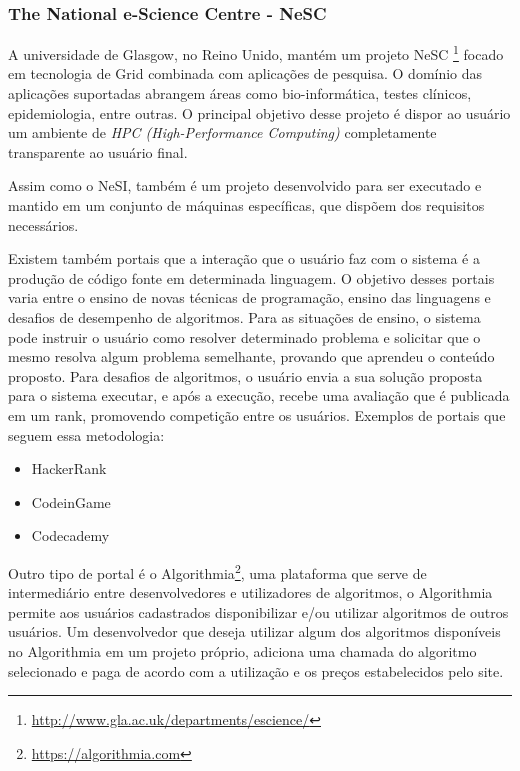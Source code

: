 \documentclass[tg]{mdtufsm}
\begin{document}
\subsubsection {The National e-Science Centre - NeSC}
A universidade de Glasgow, no Reino Unido, mantém um projeto NeSC \footnote{\url{http://www.gla.ac.uk/departments/escience/}} focado em tecnologia de Grid combinada com aplicações de pesquisa. O domínio das aplicações suportadas abrangem áreas como bio-informática, testes clínicos, epidemiologia, entre outras. O principal objetivo desse projeto é dispor ao usuário um ambiente de \emph{HPC (High-Performance Computing)} completamente transparente ao usuário final. 
\item Assim como o NeSI, também é um projeto desenvolvido para ser executado e mantido em um conjunto de máquinas específicas, que dispõem dos requisitos necessários.

\fi

Existem também portais que a interação que o usuário faz com o sistema é a produção de código fonte em determinada linguagem. O objetivo desses portais varia entre o ensino de novas técnicas de programação, ensino das linguagens e desafios de desempenho de algoritmos. Para as situações de ensino, o sistema pode instruir o usuário como resolver determinado problema e solicitar que o mesmo resolva algum problema semelhante, provando que aprendeu o conteúdo proposto.
Para desafios de algoritmos, o usuário envia a sua solução proposta para o sistema executar, e após a execução, recebe uma avaliação que é publicada em um rank, promovendo competição entre os usuários. 
Exemplos de portais que seguem essa metodologia:
\begin{itemize}
	\item HackerRank
	\item CodeinGame
	\item Codecademy
\end{itemize}

Outro tipo de portal é o Algorithmia\footnote{\url{https://algorithmia.com}}, uma plataforma que serve de intermediário entre desenvolvedores e utilizadores de algoritmos, o Algorithmia permite aos usuários cadastrados disponibilizar e/ou utilizar algoritmos de outros usuários. Um desenvolvedor que deseja utilizar algum dos algoritmos disponíveis no Algorithmia em um projeto próprio, adiciona uma chamada do algoritmo selecionado e paga de acordo com a utilização e os preços estabelecidos pelo site.

\iffalse
\end{document}
